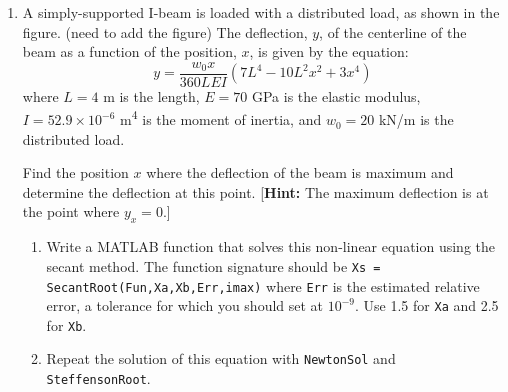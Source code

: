\begin{fullwidth}
\begin{enumerate}
\vspace{4.0cm}

\item A simply-supported I-beam is loaded with a distributed load, as shown in the figure. (need to add the figure)  The deflection, $y$, of the centerline of the beam as a function of the position, $x$, is given by the equation:
\begin{equation*}
y = \frac{w_0 x}{360 LEI}\left(7L^4 - 10L^2x^2 + 3x^4\right)
\end{equation*}
where $L=4$ m is the length, $E=70$ GPa is the elastic modulus, $I=52.9\times 10^{-6}$ m\textsuperscript{4} is the moment of inertia, and $w_0=20$ kN/m is the distributed load.

\vspace{0.25cm}

\noindent Find the position $x$ where the deflection of the beam is maximum and determine the deflection at this point. [\textbf{Hint:} The maximum deflection is at the point where $y_x = 0$.]
\begin{enumerate}
\item Write a MATLAB function that solves this non-linear equation using the secant method.  The function signature should be \lstinline[style=myMatlab]{Xs = SecantRoot(Fun,Xa,Xb,Err,imax)} where \lstinline[style=myMatlab]{Err} is the estimated relative error, a tolerance for which you should set at $10^{-9}$.  Use 1.5 for \lstinline[style=myMatlab]{Xa} and 2.5 for \lstinline[style=myMatlab]{Xb}.

\item Repeat the solution of this equation with \lstinline[style=myMatlab]{NewtonSol} and \lstinline[style=myMatlab]{SteffensonRoot}.

\end{enumerate}

\end{enumerate}

\end{fullwidth}
